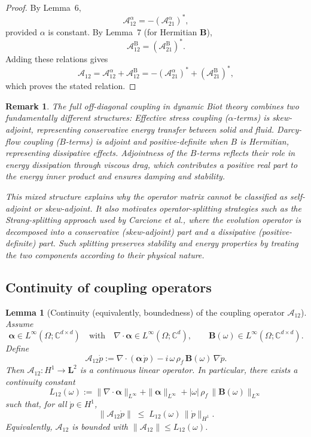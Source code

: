 \documentclass[pdflatex,sn-mathphys-num]{sn-jnl}
\theoremstyle{thmstyleone}%
\theoremstyle{thmstyletwo}%
\newtheorem{remark}{Remark}%
\theoremstyle{thmstylethree}%
\newtheorem{lemma}[theorem]{Lemma}
\theoremstyle{definition}
\begin{document}
	\begin{proof}
		By Lemma~6,
		\[
		\mathcal{A}_{12}^{\alpha} = -(\mathcal{A}_{21}^{\alpha})^*,
		\]
		provided $\alpha$ is constant. 
		By Lemma~7 (for Hermitian $\mathbf{B}$),
		\[
		\mathcal{A}_{12}^{\mathrm{B}} = (\mathcal{A}_{21}^{\mathrm{B}})^*.
		\]
		Adding these relations gives
		\[
		\mathcal{A}_{12} = \mathcal{A}_{12}^{\alpha} + \mathcal{A}_{12}^{\mathrm{B}} 
		= -(\mathcal{A}_{21}^{\alpha})^* + (\mathcal{A}_{21}^{\mathrm{B}})^*,
		\]
		which proves the stated relation.
	\end{proof}
	
	\begin{remark}
		The full off-diagonal coupling in dynamic Biot theory combines two fundamentally different structures:
		\emph{Effective stress coupling} ($\alpha$-terms) is skew-adjoint, representing conservative energy transfer between solid and fluid.
		\emph{Darcy-flow coupling} ($B$-terms) is adjoint and positive-definite when $B$ is Hermitian, representing dissipative effects.
		Adjointness of the $B$-terms reflects their role in energy dissipation through viscous drag, which contributes a positive real part to the energy inner product and ensures damping and stability.
		
		This mixed structure explains why the operator matrix cannot be classified as self-adjoint or skew-adjoint.
		It also motivates operator-splitting strategies such as the Strang-splitting approach used by Carcione et al., where the evolution operator is decomposed into a conservative (skew-adjoint) part and a dissipative (positive-definite) part.
		Such splitting preserves stability and energy properties by treating the two components according to their physical nature.
	\end{remark}
	
	\setcounter{theorem}{7}
	
	\subsection{Continuity of coupling operators}
	
	\begin{lemma}[Continuity (equivalently, boundedness) of the coupling operator $\mathcal{A}_{12}$]\label{lem:A12-continuity}
		Assume
		\[
		\boldsymbol{\alpha}\in L^\infty(\Omega;\mathbb{C}^{d\times d})
		\quad\text{with}\quad
		\nabla\!\cdot\boldsymbol{\alpha}\in L^\infty(\Omega;\mathbb{C}^d),
		\qquad
		\mathbf{B}(\omega)\in L^\infty(\Omega;\mathbb{C}^{d\times d}).
		\]
		Define
		\[
		\mathcal{A}_{12}\dot p
		:= \nabla\!\cdot(\boldsymbol{\alpha}\,\dot p) - i\,\omega\,\rho_f\,\mathbf{B}(\omega)\,\nabla \dot p .
		\]
		Then $\mathcal{A}_{12}: H^1\to \bm{L}^{2}$ is a continuous linear operator. In particular, there exists a continuity constant
		\[
		L_{12}(\omega)
		:= \|\nabla\!\cdot\boldsymbol{\alpha}\|_{L^\infty}
		+ \|\boldsymbol{\alpha}\|_{L^\infty}
		+ |\omega|\,\rho_f\,\|\mathbf{B}(\omega)\|_{L^\infty}
		\]
		such that, for all $\dot p\in H^1$,
		\[
		\|\mathcal{A}_{12}\dot p\|
		\;\le\;
		L_{12}(\omega)\,\|\dot p\|_{H^1}.
		\]
		Equivalently, $\mathcal{A}_{12}$ is bounded with $\|\mathcal{A}_{12}\|\le L_{12}(\omega)$.
	\end{lemma}
	
\end{document}

